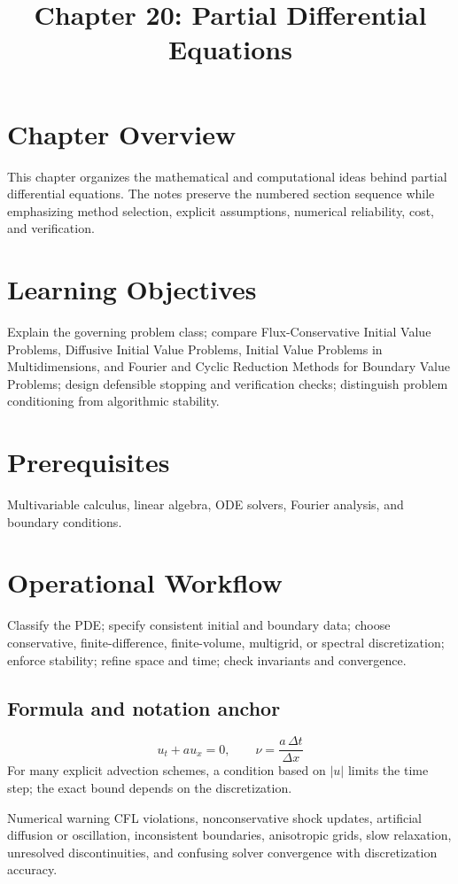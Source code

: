 \documentclass[10pt,letterpaper]{article}
\title{Chapter 20: Partial Differential Equations}
\author{}
\date{}
\begin{document}
\maketitle

\section*{Chapter Overview}
This chapter organizes the mathematical and computational ideas behind partial differential equations. The notes preserve the numbered section sequence while emphasizing method selection, explicit assumptions, numerical reliability, cost, and verification.

\section*{Learning Objectives}
Explain the governing problem class; compare Flux-Conservative Initial Value Problems, Diffusive Initial Value Problems, Initial Value Problems in Multidimensions, and Fourier and Cyclic Reduction Methods for Boundary Value Problems; design defensible stopping and verification checks; distinguish problem conditioning from algorithmic stability.

\section*{Prerequisites}
Multivariable calculus, linear algebra, ODE solvers, Fourier analysis, and boundary conditions.

\section*{Operational Workflow}
Classify the PDE; specify consistent initial and boundary data; choose conservative, finite-difference, finite-volume, multigrid, or spectral discretization; enforce stability; refine space and time; check invariants and convergence.

\subsection*{Formula and notation anchor}
\[
u_t+a u_x=0,\qquad \nu=\frac{a\,\Delta t}{\Delta x}
\]
For many explicit advection schemes, a condition based on $|
u|$ limits the time step; the exact bound depends on the discretization.

\begin{warnbox}{Numerical warning}
CFL violations, nonconservative shock updates, artificial diffusion or oscillation, inconsistent boundaries, anisotropic grids, slow relaxation, unresolved discontinuities, and confusing solver convergence with discretization accuracy.
\end{warnbox}
\end{document}
